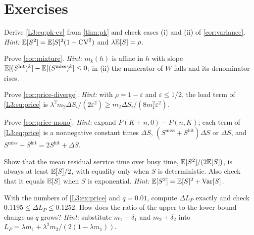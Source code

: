\section{Exercises}

\begin{exercise}\label{L3:ex:variance}
Derive \eqref{L3:eq:pk-cv} from \cref{thm:pk} and check cases (i) and (ii) of
\cref{cor:variance}.
\emph{Hint:} $\mathbb{E}[S^2]=\mathbb{E}[S]^2(1+\mathrm{CV}^2)$ and $\lambda\mathbb{E}[S]=\rho$.
\end{exercise}

\begin{exercise}\label{L3:ex:mixture}
Prove \cref{cor:mixture}.
\emph{Hint:} $m_k(h)$ is affine in $h$ with slope
$\mathbb{E}[(S^{\mathrm{hit}})^k]-\mathbb{E}[(S^{\mathrm{miss}})^k]\le0$; in (ii) the numerator of $W$
falls and its denominator rises.
\end{exercise}

\begin{exercise}\label{L3:ex:diverge}
Prove \cref{cor:price-diverge}.
\emph{Hint:} with $\rho=1-\varepsilon$ and $\varepsilon\le1/2$, the load term of
\eqref{L3:eq:price} is $\lambda^2m_2\Delta S_i/(2\varepsilon^2)\ge
m_2\Delta S_i/(8m_1^2\varepsilon^2)$.
\end{exercise}

\begin{exercise}\label{L3:ex:mono}
Prove \cref{cor:price-mono}.
\emph{Hint:} expand $P(K+n,0)-P(n,K)$; each term of \eqref{L3:eq:price} is a
nonnegative constant times $\Delta S$, $(S^{\mathrm{miss}}+S^{\mathrm{hit}})\Delta S$ or
$\Delta S$, and $S^{\mathrm{miss}}+S^{\mathrm{hit}}=2S^{\mathrm{hit}}+\Delta S$.
\end{exercise}

\begin{exercise}\label{L3:ex:1}
Show that the mean residual service time over busy time, $\mathbb{E}[S^2]/(2\mathbb{E}[S])$, is
always at least $\mathbb{E}[S]/2$, with equality only when $S$ is deterministic. Also
check that it equals $\mathbb{E}[S]$ when $S$ is exponential.
\emph{Hint:} $\mathbb{E}[S^2]=\mathbb{E}[S]^2+\operatorname{Var}[S]$.
\end{exercise}

\begin{exercise}\label{L3:ex:2}
With the numbers of \cref{L3:ex:price} and $q=0.01$, compute $\Delta L_P$ exactly
and check $0.1195\le\Delta L_P\le0.1252$. How does the ratio of the upper to the
lower bound change as $q$ grows?
\emph{Hint:} substitute $m_1+\delta_1$ and $m_2+\delta_2$ into
$L_P=\lambda m_1+\lambda^2m_2/(2(1-\lambda m_1))$.
\end{exercise}
